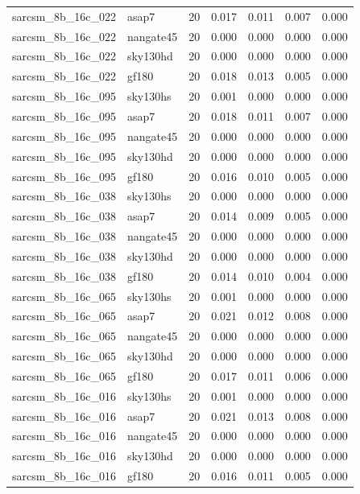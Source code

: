 \begin{tabular}{llrrrrr}
sarcsm\_8b\_16c\_022 & asap7 & 20 & 0.017 & 0.011 & 0.007 & 0.000 \\
sarcsm\_8b\_16c\_022 & nangate45 & 20 & 0.000 & 0.000 & 0.000 & 0.000 \\
sarcsm\_8b\_16c\_022 & sky130hd & 20 & 0.000 & 0.000 & 0.000 & 0.000 \\
sarcsm\_8b\_16c\_022 & gf180 & 20 & 0.018 & 0.013 & 0.005 & 0.000 \\
sarcsm\_8b\_16c\_095 & sky130hs & 20 & 0.001 & 0.000 & 0.000 & 0.000 \\
sarcsm\_8b\_16c\_095 & asap7 & 20 & 0.018 & 0.011 & 0.007 & 0.000 \\
sarcsm\_8b\_16c\_095 & nangate45 & 20 & 0.000 & 0.000 & 0.000 & 0.000 \\
sarcsm\_8b\_16c\_095 & sky130hd & 20 & 0.000 & 0.000 & 0.000 & 0.000 \\
sarcsm\_8b\_16c\_095 & gf180 & 20 & 0.016 & 0.010 & 0.005 & 0.000 \\
sarcsm\_8b\_16c\_038 & sky130hs & 20 & 0.000 & 0.000 & 0.000 & 0.000 \\
sarcsm\_8b\_16c\_038 & asap7 & 20 & 0.014 & 0.009 & 0.005 & 0.000 \\
sarcsm\_8b\_16c\_038 & nangate45 & 20 & 0.000 & 0.000 & 0.000 & 0.000 \\
sarcsm\_8b\_16c\_038 & sky130hd & 20 & 0.000 & 0.000 & 0.000 & 0.000 \\
sarcsm\_8b\_16c\_038 & gf180 & 20 & 0.014 & 0.010 & 0.004 & 0.000 \\
sarcsm\_8b\_16c\_065 & sky130hs & 20 & 0.001 & 0.000 & 0.000 & 0.000 \\
sarcsm\_8b\_16c\_065 & asap7 & 20 & 0.021 & 0.012 & 0.008 & 0.000 \\
sarcsm\_8b\_16c\_065 & nangate45 & 20 & 0.000 & 0.000 & 0.000 & 0.000 \\
sarcsm\_8b\_16c\_065 & sky130hd & 20 & 0.000 & 0.000 & 0.000 & 0.000 \\
sarcsm\_8b\_16c\_065 & gf180 & 20 & 0.017 & 0.011 & 0.006 & 0.000 \\
sarcsm\_8b\_16c\_016 & sky130hs & 20 & 0.001 & 0.000 & 0.000 & 0.000 \\
sarcsm\_8b\_16c\_016 & asap7 & 20 & 0.021 & 0.013 & 0.008 & 0.000 \\
sarcsm\_8b\_16c\_016 & nangate45 & 20 & 0.000 & 0.000 & 0.000 & 0.000 \\
sarcsm\_8b\_16c\_016 & sky130hd & 20 & 0.000 & 0.000 & 0.000 & 0.000 \\
sarcsm\_8b\_16c\_016 & gf180 & 20 & 0.016 & 0.011 & 0.005 & 0.000 \\

\end{tabular}
